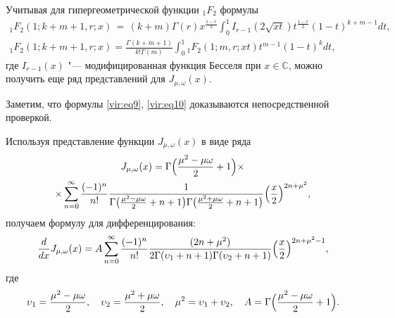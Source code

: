 Учитывая для гипергеометрической функции ${ }_1 F_2 $ формулы
\begin{gather}
\label{vir:eq9}
{ }_1 F_2 ( 1;k{+}m{+}1, r; x)\, {=}\, ( k{+}m)\Gamma ( r )x^{\frac{1-r}{2}}\int_0^1 \!\!
I_{r-1} ( 2\sqrt {xt} ) t^{\frac{1-r}{2}}( 1-t)^{k+m-1}dt,
\\
\label{vir:eq10}
{ }_1 F_2 (1; k+m+1, r; x)=\frac{\Gamma (k+m+1)}{k!\Gamma ( m)}\int_0^1 { }_1 F_2 ( 1; m, r; xt)t^{m-1}(1-t)^k dt,
\end{gather}
где $I_{r-1} (x)$ "--- модифицированная функция Бесселя при $x\in \mathbb C$, 
можно получить еще ряд представлений для $J_{\mu ,\omega } ( x )$.

Заметим, что формулы \eqref{vir:eq9}, \eqref{vir:eq10} доказываются непосредственной проверкой.


Используя представление функции $J_{\mu ,\omega } ( x )$ в виде ряда
\begin{multline}
\label{vir:real:eq13}
J_{\mu ,\omega } ( x )=\Gamma \Bigl( \frac{\mu ^2-\mu \omega }{2}+1 \Bigr)\times 
\\
\times \sum\limits_{n=0}^\infty 
\frac{(-1)^n}{n!} \frac{1}{\Gamma \bigl( \frac{\mu ^2-\mu \omega }{2}+n+1 \bigr)\Gamma \bigl( \frac{\mu ^2+\mu \omega }{2}+n+1  \bigr)}
\Bigl( \frac{x}{2} \Bigr) ^{2n+\mu ^2},
\end{multline}
получаем формулу для дифференцирования:
\begin{equation}
\label{vir:eq11}
\frac{d}{dx}J_{\mu ,\omega } ( x )=A\sum\limits_{n=0}^\infty 
\frac{(-1)^n}{n!}\frac{( 2n+\mu ^2)}{2\Gamma 
(\upsilon _1 +n+1)\Gamma (\upsilon _2 +n+1)}\Bigl( \frac{x}{2}\Bigr)^{2n+\mu ^2-1},
\end{equation}
где
\[
\upsilon _1 =\frac{\mu ^2-\mu \omega }{2},\quad 
\upsilon _2 =\frac{\mu ^2+\mu \omega }{2},\quad 
\mu ^2=\upsilon _1 +\upsilon _2 ,\quad 
A=\Gamma \Bigl( \frac{\mu ^2-\mu \omega }{2}+1 \Bigr).
\]


